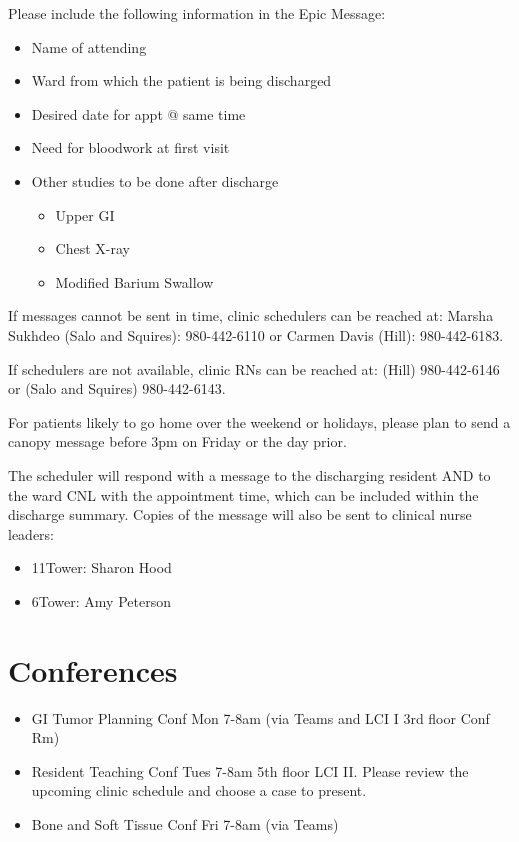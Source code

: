 \documentclass[
]{book}
\providecommand{\tightlist}{%
  \setlength{\itemsep}{0pt}\setlength{\parskip}{0pt}}
\begin{document}
Please include the following information in the Epic Message:

\begin{itemize}
\tightlist
\item
  Name of attending
\item
  Ward from which the patient is being discharged
\item
  Desired date for appt @ same time
\item
  Need for bloodwork at first visit
\item
  Other studies to be done after discharge

  \begin{itemize}
  \tightlist
  \item
    Upper GI
  \item
    Chest X-ray
  \item
    Modified Barium Swallow
  \end{itemize}
\end{itemize}

If messages cannot be sent in time, clinic schedulers can be reached at: Marsha Sukhdeo (Salo and Squires): 980-442-6110 or Carmen Davis (Hill): 980-442-6183.

If schedulers are not available, clinic RNs can be reached at: (Hill) 980-442-6146 or (Salo and Squires) 980-442-6143.

For patients likely to go home over the weekend or holidays, please plan to send a canopy message before 3pm on Friday or the day prior.

The scheduler will respond with a message to the discharging resident AND to the ward CNL with the appointment time, which can be included within the discharge summary. Copies of the message will also be sent to clinical nurse leaders:

\begin{itemize}
\tightlist
\item
  11Tower: Sharon Hood
\item
  6Tower: Amy Peterson
\end{itemize}

\hypertarget{conferences}{%
\section{Conferences}\label{conferences}}

\begin{itemize}
\tightlist
\item
  GI Tumor Planning Conf Mon 7-8am (via Teams and LCI I 3rd floor Conf Rm)
\item
  Resident Teaching Conf Tues 7-8am 5th floor LCI II. Please review the upcoming clinic schedule and choose a case to present.
\item
  Bone and Soft Tissue Conf Fri 7-8am (via Teams)
\end{itemize}
\end{document}
